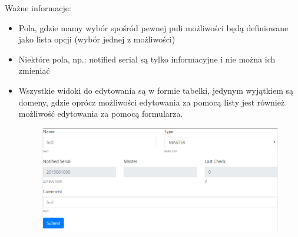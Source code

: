 \documentclass[12pt] {article}
\begin{document}
Ważne informacje:
\begin{itemize}
\item Pola, gdzie mamy wybór spośród pewnej puli możliwości będą definiowane jako lista opcji (wybór jednej z możliwości)
\item Niektóre pola, np.: notified serial są tylko informacyjne i nie można ich zmieniać
\item Wszystkie widoki do edytowania są w formie tabelki, jedynym wyjątkiem są domeny, gdzie oprócz możliwości edytowania za pomocą listy jest również możliwość edytowania za pomocą formularza. 
\begin{figure}[H]
\centering
\includegraphics[width=\textwidth]{res/formularz}
\end{figure}
\end{itemize}
\end{document}
